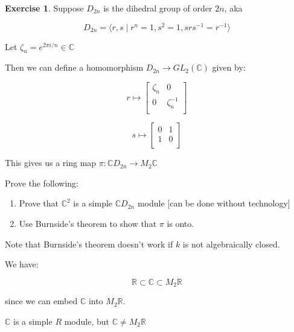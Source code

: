 \documentclass{article}
\theoremstyle{definition}
\newtheorem*{exercise}{Exercise}
\begin{document}
\begin{exercise}
    Suppose \(D_{2n}\) is the dihedral group of order \(2n\), aka

    \[
        D_{2n} = \langle r, s \mid r^n = 1, s^2 = 1, s r s ^{-1} = r ^{-1} \rangle 
    \]

    Let \(\zeta _n = e^{2 \pi i / n} \in \mathbb{C}\)

    Then we can define a homomorphism \(D_{2n} \to GL_2(\mathbb{C})\) given by:

    \[
        r \mapsto \begin{bmatrix}
            \zeta _n &  0 \\
            0 &  \zeta_n ^{-1} \\
        \end{bmatrix}
    \]

    \[
        s \mapsto \begin{bmatrix}
            0 &  1 \\
            1 &  0 \\
        \end{bmatrix}
    \]

    This gives us a ring map \(\pi:\mathbb{C} D_{2n} \to M_2\mathbb{C}\)

    Prove the following:

    \begin{enumerate}[label=\alph*)]
        \item Prove that \(\mathbb{C}^2\) is a simple \(\mathbb{C} D_{2n}\) module [can be done without technology]
        \item Use Burnside's theorem to show that \(\pi\) is onto.
    \end{enumerate} 
\end{exercise}

Note that Burnside's theorem doesn't work if \(k\) is not algebraically closed.

We have:

\[
    \mathbb{R} \subset \mathbb{C} \subset M_2\mathbb{R}
\]

since we can embed \(\mathbb{C}\) into \(M_2\mathbb{R}\).

\(\mathbb{C}\) is a simple \(R\) module, but \(\mathbb{C} \neq M_2\mathbb{R}\) 
\end{document}
